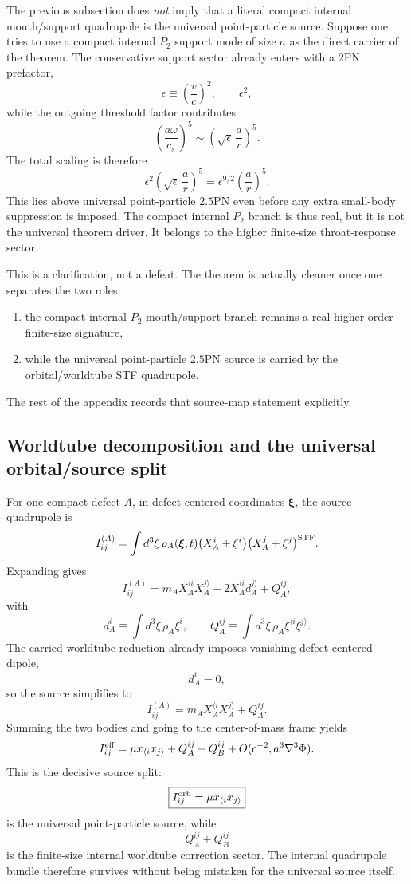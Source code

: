 \documentclass[11pt]{article}
\begin{document}
The previous subsection does \emph{not} imply that a literal compact internal
mouth/support quadrupole is the universal point-particle source.  Suppose one
tries to use a compact internal $P_2$ support mode of size $a$ as the direct
carrier of the theorem.  The conservative support sector already enters with a
$2$PN prefactor,
\[
\epsilon\equiv\left(\frac{v}{c}\right)^2,
\qquad
\epsilon^2,
\]
while the outgoing threshold factor contributes
\[
\left(\frac{a\omega}{c_s}\right)^5
\sim
\left(\sqrt\epsilon\,\frac{a}{r}\right)^5.
\]
The total scaling is therefore
\[
\epsilon^2\left(\sqrt\epsilon\,\frac{a}{r}\right)^5
=
\epsilon^{9/2}\left(\frac{a}{r}\right)^5.
\]
This lies above universal point-particle $2.5$PN even before any extra
small-body suppression is imposed.  The compact internal $P_2$ branch is thus
real, but it is not the universal theorem driver.  It belongs to the higher
finite-size throat-response sector.

This is a clarification, not a defeat.  The theorem is actually cleaner once
one separates the two roles:
\begin{enumerate}
  \item the compact internal $P_2$ mouth/support branch remains a real
  higher-order finite-size signature,
  \item while the universal point-particle $2.5$PN source is carried by the
  orbital/worldtube STF quadrupole.
\end{enumerate}
The rest of the appendix records that source-map statement explicitly.

\subsection{Worldtube decomposition and the universal orbital/source split}
\label{app:quad-ledger-worldtube-split}

For one compact defect $A$, in defect-centered coordinates $\boldsymbol\xi$, the
source quadrupole is
\[
I_{ij}^{(A)}
=
\int d^3\xi\,\rho_A(\boldsymbol\xi,t)
\bigl(X_A^i+\xi^i\bigr)\bigl(X_A^j+\xi^j\bigr)^{\rm STF}.
\]
Expanding gives
\[
I_{ij}^{(A)}
=
m_A X_A^{\langle i}X_A^{j\rangle}
+2X_A^{\langle i}d_A^{j\rangle}
+Q_A^{ij},
\]
with
\[
d_A^i\equiv\int d^3\xi\,\rho_A\xi^i,
\qquad
Q_A^{ij}\equiv\int d^3\xi\,\rho_A\xi^{\langle i}\xi^{j\rangle}.
\]
The carried worldtube reduction already imposes vanishing defect-centered
dipole,
\[
d_A^i=0,
\]
so the source simplifies to
\[
I_{ij}^{(A)}=m_A X_A^{\langle i}X_A^{j\rangle}+Q_A^{ij}.
\]
Summing the two bodies and going to the center-of-mass frame yields
\[
I_{ij}^{\rm eff}
=
\mu x_{\langle i}x_{j\rangle}+Q_A^{ij}+Q_B^{ij}
+O(c^{-2},a^3\nabla^3\Phi).
\]
This is the decisive source split:
\[
\boxed{I_{ij}^{\rm orb}=\mu x_{\langle i}x_{j\rangle}}
\]
is the universal point-particle source, while
\[
Q_A^{ij}+Q_B^{ij}
\]
is the finite-size internal worldtube correction sector.  The internal
quadrupole bundle therefore survives without being mistaken for the universal
source itself.
\end{document}
